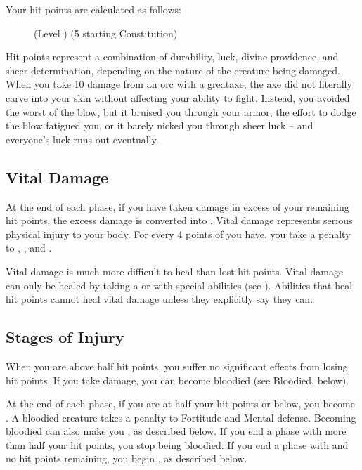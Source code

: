         Your hit points are calculated as follows:

        \begin{figure}[h]
            \centering (Level ) \x (5 \add starting Constitution)
        \end{figure}

         Hit points represent a combination of durability, luck, divine providence, and sheer determination, depending on the nature of the creature being damaged.
        When you take 10 damage from an orc with a greataxe, the axe did not literally carve into your skin without affecting your ability to fight.
        Instead, you avoided the worst of the blow, but it bruised you through your armor, the effort to dodge the blow fatigued you, or it barely nicked you through sheer luck -- and everyone's luck runs out eventually.

    \subsection{Vital Damage}\label{Vital Damage}
        At the end of each phase, if you have taken damage in excess of your remaining hit points, the excess damage is converted into .
        Vital damage represents serious physical injury to your body.
        For every 4 points of  you have, you take a  penalty to , , and .

         Vital damage is much more difficult to heal than lost hit points.
        Vital damage can only be healed by taking a  or with special abilities (see ).
        Abilities that heal hit points cannot heal vital damage unless they explicitly say they can.

    \subsection{Stages of Injury}

         When you are above half hit points, you suffer no significant effects from losing hit points.
        If you take damage, you can become bloodied (see Bloodied, below).

         At the end of each phase, if you are at half your hit points or below, you become .
        A bloodied creature takes a  penalty to Fortitude and Mental defense.
        Becoming bloodied can also make you , as described below.
        If you end a phase with more than half your hit points, you stop being bloodied.
        If you end a phase with  and no hit points remaining, you begin , as described below.

